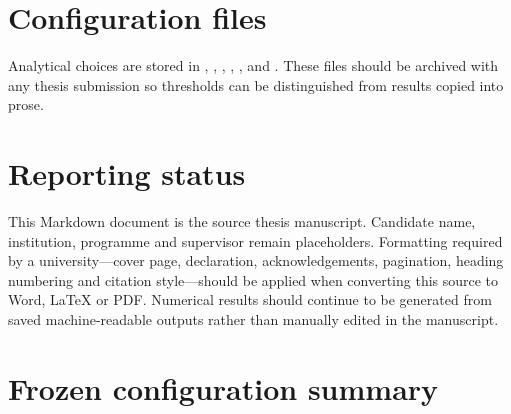 \chapter{Configuration files}
\label{app:configuration_files}

Analytical choices are stored in , , , , ,  and . These files should be archived with any thesis submission so thresholds can be distinguished from results copied into prose.

\chapter{Reporting status}
\label{app:reporting_status}

This Markdown document is the source thesis manuscript. Candidate name, institution, programme and supervisor remain placeholders. Formatting required by a university—cover page, declaration, acknowledgements, pagination, heading numbering and citation style—should be applied when converting this source to Word, LaTeX or PDF. Numerical results should continue to be generated from saved machine-readable outputs rather than manually edited in the manuscript.

\chapter{Frozen configuration summary}
\label{app:frozen_configuration_summary}

